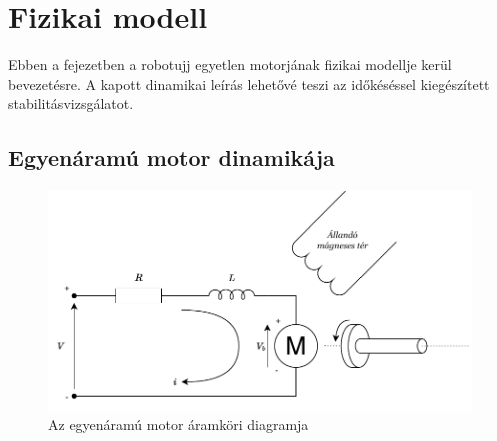 \chapter{Fizikai modell}\label{chap:physical_system}

Ebben a fejezetben a robotujj egyetlen motorjának fizikai modellje kerül bevezetésre. A kapott dinamikai leírás
lehetővé teszi az időkéséssel kiegészített stabilitásvizsgálatot. 

\section{Egyenáramú motor dinamikája}

\begin{figure}[h]
\begin{center}
\includegraphics[width=\textwidth]{images/motor_model_electric.pdf}
\caption{Az egyenáramú motor áramköri diagramja}
\label{fig:dc_motor_electric}
\end{center}
\end{figure}

